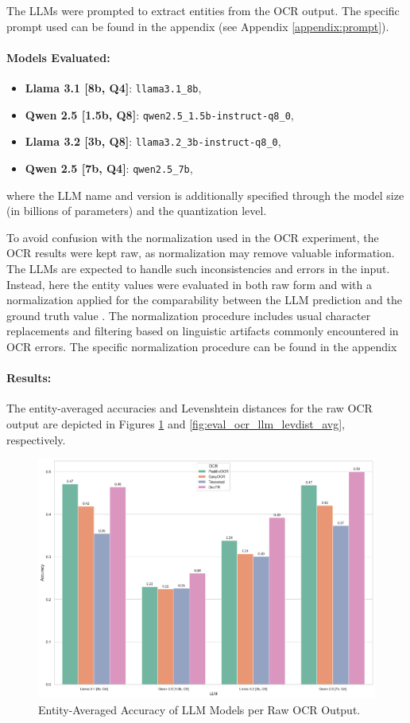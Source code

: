 \documentclass[11pt]{article}
\begin{document}
The LLMs were prompted to extract entities from the OCR output. The specific prompt used can be found in the appendix (see Appendix \ref{appendix:prompt}).

\paragraph{Models Evaluated:}
\begin{itemize}
    \item \textbf{Llama 3.1 [8b, Q4]}: \texttt{llama3.1\_8b},
    \item \textbf{Qwen 2.5 [1.5b, Q8]}: \texttt{qwen2.5\_1.5b-instruct-q8\_0},
    \item \textbf{Llama 3.2 [3b, Q8]}: \texttt{llama3.2\_3b-instruct-q8\_0},
    \item \textbf{Qwen 2.5 [7b, Q4]}: \texttt{qwen2.5\_7b},
\end{itemize}
where the LLM name and version is additionally specified through the model size (in billions of parameters) and the quantization level.


To avoid confusion with the normalization used in the OCR experiment, the OCR results were kept raw, as normalization may remove valuable information. The LLMs are expected to handle such inconsistencies and errors in the input. Instead, here the entity values were evaluated in both raw form and with a normalization applied for the comparability between the LLM prediction and the ground truth value . The normalization procedure includes usual character replacements and filtering based on linguistic artifacts commonly encountered in OCR errors. The specific normalization procedure can be found in the appendix 

\paragraph{Results:}
The entity-averaged accuracies and Levenshtein distances for the raw OCR output are depicted in Figures \ref{fig:eval_ocr_llm_accuracies_avg} and \ref{fig:eval_ocr_llm_levdist_avg}, respectively.

\begin{figure}[h!]
    \centering
    \includegraphics[width=0.8\linewidth]{figures/eval_ocr_llm_accuracies_avg.png}
    \caption{Entity-Averaged Accuracy of LLM Models per Raw OCR Output.}
    \label{fig:eval_ocr_llm_accuracies_avg}
\end{figure}
\end{document}
